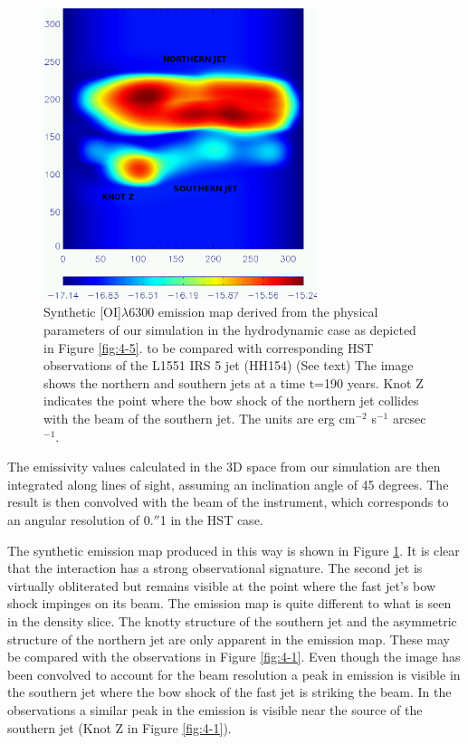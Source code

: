 \documentclass{aa}
\begin{document}
\begin{figure}[ht]
\centering
\includegraphics[width=8cm]{8609fig7.eps}
\caption{  Synthetic [OI]$\lambda$6300 
emission map derived from the 
physical parameters of our simulation in the hydrodynamic case as depicted in
Figure \ref{fig:4-5}.
to be compared with corresponding HST observations of the 
L1551 IRS 5 jet (HH154) (See text)
 The image shows the northern and southern jets at a time t=190 years. 
 Knot Z indicates the point where the bow shock of the northern jet collides
 with the beam of the southern jet.
 The units are erg cm$^{-2}$ s$^{-1}$ arcsec$^{-1}$.
}
\label{fig:4-21} 
\end{figure}

The emissivity values calculated in the 3D space 
from {our simulation} are then integrated along {lines of sight}, assuming an inclination 
angle of 45 degrees. 
The result is then convolved with the beam of the 
instrument, which {corresponds to} an angular resolution of 0.$''$1 in the HST case. 
 
The synthetic emission map produced in this way is shown in 
Figure \ref{fig:4-21}. It is clear that the interaction has a 
strong observational signature. The second jet is virtually 
obliterated but remains visible at the point where the 
fast jet's bow shock impinges on its beam. 
The emission map is quite different to what is seen in the density 
slice. 
The knotty structure of the southern jet and the asymmetric structure of the
northern jet are only apparent in the emission map.
These may be compared with the observations in Figure \ref{fig:4-1}.
Even though the image has been convolved to account for the beam
resolution
a peak in emission is visible in the southern jet where the bow shock of the
fast jet is striking the beam.
In the observations a similar peak in the emission is visible near the source of
the southern jet (Knot Z in Figure \ref{fig:4-1}).
\end{document}
